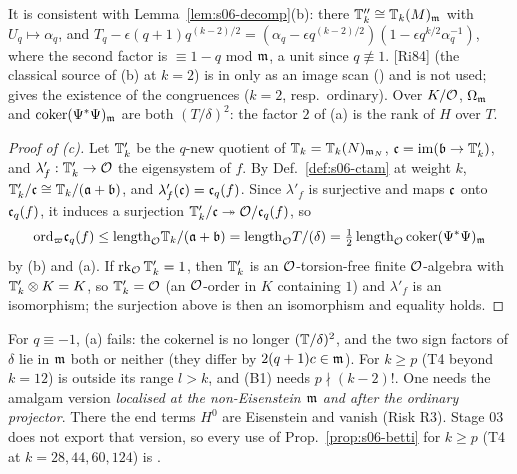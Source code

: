 \noindent It is consistent with Lemma~\ref{lem:s06-decomp}(b): there $\mathbb{T}''_k\cong\mathbb{T}_k(M)_{\mathfrak{m}}$ with $U_q\mapsto\alpha_q$, and
$T_q-\epsilon(q+1)q^{(k-2)/2}=(\alpha_q-\epsilon q^{(k-2)/2})(1-\epsilon q^{k/2}\alpha_q^{-1})$, where the second factor is
$\equiv1-q$ mod $\mathfrak{m}$, a unit since $q\not\equiv1$.  [Ri84] (the classical source of (b) at $k=2$) is in  only as an image scan
() and is not used; \cite[Thm~4A--4C, p.~61--63, Cor.~6.9,
p.~80]{Dia89}  gives the existence of
the congruences ($k=2$, resp.\ ordinary). Over $K/\mathcal{O}$, $\Omega_{\mathfrak{m}}$ and $\operatorname{coker}(\Psi^*\Psi)_{\mathfrak{m}}$ are both $(T/\delta)^2$: the factor $2$ of (a) is
the rank of $H$ over $T$.

\begin{proof}[Proof of (c)]
Let $\mathbb{T}'_k$ be the $q$-new quotient of $\mathbb{T}_k=\mathbb{T}_k(N)_{\mathfrak{m}_N}$, $\mathfrak{c}=\mathrm{im}(\mathfrak{b}\to\mathbb{T}'_k)$, and $\lambda'_f:\mathbb{T}'_k\to\mathcal{O}$ the eigensystem of $f$.
By Def.~\ref{def:s06-ctam} at weight $k$, $\mathbb{T}'_k/\mathfrak{c}\cong\mathbb{T}_k/(\mathfrak{a}+\mathfrak{b})$, and $\lambda'_f(\mathfrak{c})=\mathfrak{c}_q(f)$. Since $\lambda'_f$ is surjective and maps $\mathfrak{c}$
onto $\mathfrak{c}_q(f)$, it induces a surjection $\mathbb{T}'_k/\mathfrak{c}\twoheadrightarrow\mathcal{O}/\mathfrak{c}_q(f)$, so
\[\mathrm{ord}_\varpi\mathfrak{c}_q(f)\le\mathrm{length}_{\mathcal{O}}\mathbb{T}_k/(\mathfrak{a}+\mathfrak{b})=\mathrm{length}_{\mathcal{O}} T/(\delta)=\tfrac12\,\mathrm{length}_{\mathcal{O}}\operatorname{coker}(\Psi^*\Psi)_{\mathfrak{m}}\]
by (b) and (a). If $\operatorname{rk}_{\mathcal{O}}\mathbb{T}'_k=1$, then $\mathbb{T}'_k$ is an $\mathcal{O}$-torsion-free finite $\mathcal{O}$-algebra with $\mathbb{T}'_k\otimes K=K$, so $\mathbb{T}'_k=\mathcal{O}$ (an
$\mathcal{O}$-order in $K$ containing $1$) and $\lambda'_f$ is an isomorphism; the surjection above is then an isomorphism and equality holds.
\end{proof}

\begin{remark}[weights $k\ge p$]\label{rem:s06-betti-kp}
For $q\equiv-1$, (a) fails: the cokernel is no longer $(\mathbb{T}/\delta)^2$, and the two sign factors of $\delta$ lie in $\mathfrak{m}$ both or neither (they differ by $2(q+1)c\in\mathfrak{m}$). For $k\ge p$
(T4 beyond $k=12$)  is outside its range $l>k$, and (B1) needs $p\nmid(k-2)!$. One needs the amalgam version
\emph{localised at the non-Eisenstein $\mathfrak{m}$ and after the ordinary projector}. There the end terms $H^0$ are Eisenstein and vanish
(Risk R3). Stage 03 does not export that version, so every use of Prop.~\ref{prop:s06-betti} for $k\ge p$ (T4 at $k=28,44,60,124$)
is \stexp. 
\end{remark}
